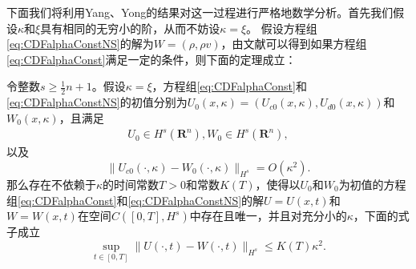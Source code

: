	下面我们将利用Yang、Yong的结果\cite{yang2015validity}对这一过程进行严格地数学分析。首先我们假设$\kappa$和$\xi$具有相同的无穷小的阶，从而不妨设$\kappa = \xi$。
	假设方程组\eqref{eq:CDFalphaConstNS}的解为$W = (\rho,\rho v)$，由文献\cite{yang2015validity}可以得到如果方程组\eqref{eq:CDFalphaConst}满足一定的条件，则下面的定理成立：
	\begin{theorem} \label{th:chapmanenskog}
		令整数$s \ge \frac{1}{2}n+1$。假设$\kappa=\xi$，方程组\eqref{eq:CDFalphaConst}和\eqref{eq:CDFalphaConstNS}的初值分别为$U_0(x,\kappa) = (U_{c0}(x,\kappa),U_{d0}(x,\kappa))$和$W_0(x,\kappa)$，且满足
		\begin{eqnarray*}
			U_0 \in H^s(\mathbf{R}^n), W_0 \in H^s(\mathbf{R}^n),
		\end{eqnarray*}
		以及
		\begin{equation*}
			\|U_{c0}(\cdot,\kappa) - W_0(\cdot, \kappa) \|_{H^s} = O(\kappa^2).
		\end{equation*}
		那么存在不依赖于$\kappa$的时间常数$T>0$和常数$K(T)$，使得以$U_0$和$W_0$为初值的方程组\eqref{eq:CDFalphaConst}和\eqref{eq:CDFalphaConstNS}的解$U=U(x,t)$和$W=W(x,t)$在空间$C([0,T],H^s)$中存在且唯一，并且对充分小的$\kappa$，下面的式子成立
		\begin{equation}
			\sup_{t \in [0,T]} \| U(\cdot,t) - W(\cdot,t) \|_{H^s} \le K(T) \kappa^2.
		\end{equation}
	\end{theorem}

